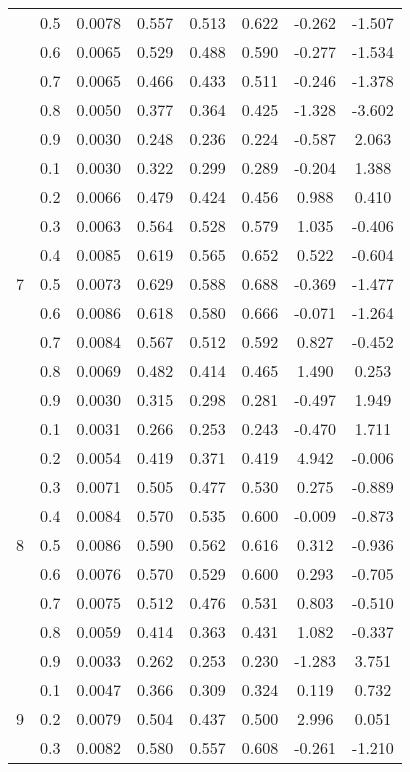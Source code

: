 \documentclass[11pt,a4paper]{report}
\begin{document}
\begin{longtable}{ | c | c || c | c | c | c | c | c | }
 & 0.5 & 0.0078 & 0.557 & 0.513 & 0.622 & -0.262 & -1.507 \\
 & 0.6 & 0.0065 & 0.529 & 0.488 & 0.590 & -0.277 & -1.534 \\
 & 0.7 & 0.0065 & 0.466 & 0.433 & 0.511 & -0.246 & -1.378 \\
 & 0.8 & 0.0050 & 0.377 & 0.364 & 0.425 & -1.328 & -3.602 \\
 & 0.9 & 0.0030 & 0.248 & 0.236 & 0.224 & -0.587 & 2.063 \\
 \hline
\multirow{9}{*}{7} & 0.1 & 0.0030 & 0.322 & 0.299 & 0.289 & -0.204 & 1.388 \\
 & 0.2 & 0.0066 & 0.479 & 0.424 & 0.456 & 0.988 & 0.410 \\
 & 0.3 & 0.0063 & 0.564 & 0.528 & 0.579 & 1.035 & -0.406 \\
 & 0.4 & 0.0085 & 0.619 & 0.565 & 0.652 & 0.522 & -0.604 \\
 & 0.5 & 0.0073 & 0.629 & 0.588 & 0.688 & -0.369 & -1.477 \\
 & 0.6 & 0.0086 & 0.618 & 0.580 & 0.666 & -0.071 & -1.264 \\
 & 0.7 & 0.0084 & 0.567 & 0.512 & 0.592 & 0.827 & -0.452 \\
 & 0.8 & 0.0069 & 0.482 & 0.414 & 0.465 & 1.490 & 0.253 \\
 & 0.9 & 0.0030 & 0.315 & 0.298 & 0.281 & -0.497 & 1.949 \\
 \hline
\multirow{9}{*}{8} & 0.1 & 0.0031 & 0.266 & 0.253 & 0.243 & -0.470 & 1.711 \\
 & 0.2 & 0.0054 & 0.419 & 0.371 & 0.419 & 4.942 & -0.006 \\
 & 0.3 & 0.0071 & 0.505 & 0.477 & 0.530 & 0.275 & -0.889 \\
 & 0.4 & 0.0084 & 0.570 & 0.535 & 0.600 & -0.009 & -0.873 \\
 & 0.5 & 0.0086 & 0.590 & 0.562 & 0.616 & 0.312 & -0.936 \\
 & 0.6 & 0.0076 & 0.570 & 0.529 & 0.600 & 0.293 & -0.705 \\
 & 0.7 & 0.0075 & 0.512 & 0.476 & 0.531 & 0.803 & -0.510 \\
 & 0.8 & 0.0059 & 0.414 & 0.363 & 0.431 & 1.082 & -0.337 \\
 & 0.9 & 0.0033 & 0.262 & 0.253 & 0.230 & -1.283 & 3.751 \\
 \hline
\multirow{9}{*}{9} & 0.1 & 0.0047 & 0.366 & 0.309 & 0.324 & 0.119 & 0.732 \\
 & 0.2 & 0.0079 & 0.504 & 0.437 & 0.500 & 2.996 & 0.051 \\
 & 0.3 & 0.0082 & 0.580 & 0.557 & 0.608 & -0.261 & -1.210 \\

\end{longtable}
\end{document}
